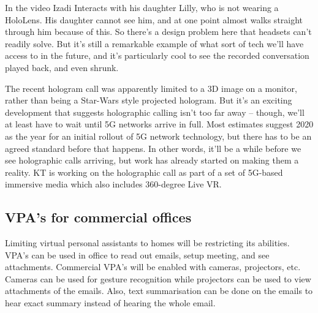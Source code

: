\documentclass[12pt,a4paper]{article}
\begin{document}
In the video Izadi Interacts with his daughter Lilly, who is not wearing a HoloLens. His daughter cannot see him, and at one point almost walks straight through him because of this.
So there’s a design problem here that headsets can’t readily solve. But it’s still a remarkable example of what sort of tech we’ll have access to in the future, and it’s particularly cool to see the recorded conversation played back, and even shrunk.

 The recent hologram call was apparently limited to a 3D image on a monitor, rather than being a Star-Wars style projected hologram. But it’s an exciting development that suggests holographic calling isn’t too far away – though, we’ll at least have to wait until 5G networks arrive in full. Most estimates suggest 2020 as the year for an initial rollout of 5G network technology, but there has to be an agreed standard before that happens. In other words, it’ll be a while before we see holographic calls arriving, but work has already started on making them a reality. KT is working on the holographic call as part of a set of 5G-based immersive media which also includes 360-degree Live VR.



\newpage
\begin{center}
\section{VPA’s for commercial offices}
\end{center}
\par
Limiting virtual personal assistants to homes will be restricting its abilities. VPA’s can be used in office to read out emails, setup meeting, and see attachments. Commercial VPA’s will be enabled with cameras, projectors, etc. Cameras can be used for gesture recognition while projectors can be used to view attachments of the emails. Also, text summarisation can be done on the emails to hear exact summary instead of hearing the whole email. 
\end{document}
